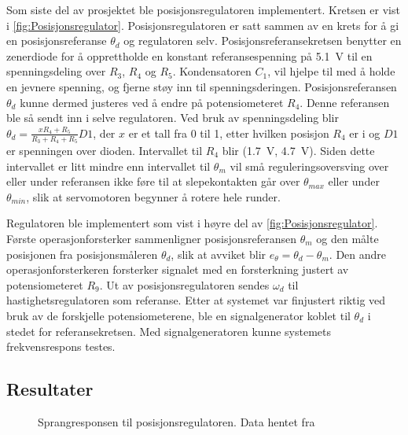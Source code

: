 Som siste del av prosjektet ble posisjonsregulatoren implementert. Kretsen er vist i \autoref{fig:Posisjonsregulator}. Posisjonsregulatoren er satt sammen av en krets for å gi en posisjonsreferanse $\theta_d$ og regulatoren selv.
Posisjonsreferansekretsen benytter en zenerdiode for å opprettholde en konstant referansespenning på {\SI{5.1}{\volt}} til en spenningsdeling over $R_3$, $R_4$ og $R_5$. Kondensatoren $C_1$, vil hjelpe til med å holde en jevnere spenning, og fjerne støy inn til spenningsderingen. Posisjonsreferansen $\theta_d$ kunne dermed justeres ved å endre på potensiometeret $R_4$. Denne referansen ble så sendt inn i selve regulatoren. Ved bruk av spenningsdeling blir $\theta_d = \frac{x R_4 + R_5}{R_3 + R_4 + R_5} D1$, der $x$ er et tall fra 0 til 1, etter hvilken posisjon $R_4$ er i og $D1$ er spenningen over dioden. Intervallet til $R_4$ blir (\SI{1.7}{\volt}, \SI{4.7}{\volt}). Siden dette intervallet er litt mindre enn intervallet til $\theta_m$ vil små reguleringsoversving over eller under referansen ikke føre til at slepekontakten går over $\theta_{max}$ eller under $\theta_{min}$, slik at servomotoren begynner å rotere hele runder.

Regulatoren ble implementert som vist i høyre del av \autoref{fig:Posisjonsregulator}. Første operasjonforsterker sammenligner posisjonsreferansen $\theta_m$ og den målte posisjonen fra posisjonsmåleren $\theta_d$, slik at avviket blir $e_{\theta} = \theta_d - \theta_m$. Den andre operasjonforsterkeren forsterker signalet med en forsterkning justert av potensiometeret $R_9$. Ut av posisjonsregulatoren sendes $\omega_d$ til hastighetsregulatoren som referanse.
Etter at systemet var finjustert riktig ved bruk av de forskjelle potensiometerene, ble en signalgenerator koblet til $\theta_d$ i stedet for referansekretsen. Med signalgeneratoren kunne systemets frekvensrespons testes.







\subsection{Resultater}

\begin{figure}[h]
    \centering
    
    \caption{Sprangresponsen til posisjonsregulatoren. Data hentet fra \cite{EksempelData}}
    \label{fig:posisjon_P_regulator}
\end{figure}

